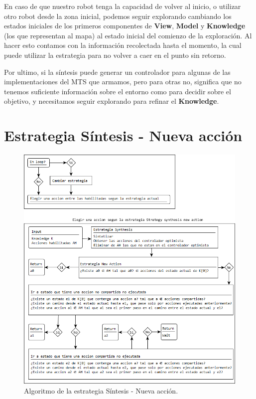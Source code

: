 \vspace{\baselineskip}
En caso de que nuestro robot tenga la capacidad de volver al inicio, o utilizar otro robot desde la zona inicial, podemos seguir explorando cambiando los
estados iniciales de los primeros componentes de \textbf{View}, \textbf{Model} y \textbf{Knowledge} (los que representan al mapa) al estado inicial del comienzo
de la exploración. Al hacer esto contamos con la información recolectada hasta el momento, la cual puede utilizar la estrategia para no volver a caer en el
punto sin retorno.

\vspace{\baselineskip}
Por ultimo, si la síntesis puede generar un controlador para algunas de las implementaciones del MTS que armamos, pero para otras no, significa que no tenemos
suficiente información sobre el entorno como para decidir sobre el objetivo, y necesitamos seguir explorando para refinar el \textbf{Knowledge}.

\section{Estrategia Síntesis - Nueva acción}

\begin{figure}[H]
  \centering
    \includegraphics[width=1.0\textwidth]{Imagenes/Algoritmo/Algoritmo_elegir.png}
  \caption{Algoritmo de la estrategia Síntesis - Nueva acción.}
  \label{fig:Algoritmo_elegir}
\end{figure}

